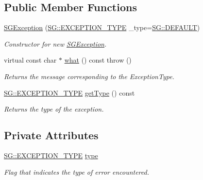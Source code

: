 \subsection*{Public Member Functions}
\begin{DoxyCompactItemize}
\item 
\mbox{\label{classSGException_a45a1ee37ef4e6d20c9711ee417009889}} 
\hyperlink{classSGException_a45a1ee37ef4e6d20c9711ee417009889}{S\+G\+Exception} (\hyperlink{namespaceSG_a671df7c720746d1e853deee02bad6411}{S\+G\+::\+E\+X\+C\+E\+P\+T\+I\+O\+N\+\_\+\+T\+Y\+PE} \+\_\+type=\hyperlink{namespaceSG_a671df7c720746d1e853deee02bad6411a0c0f6f82ce3e38637b36fdf4fe34d79f}{S\+G\+::\+D\+E\+F\+A\+U\+LT})
\begin{DoxyCompactList}\small\item\em Constructor for new \hyperlink{classSGException}{S\+G\+Exception}. \end{DoxyCompactList}\item 
\mbox{\label{classSGException_a5a43e290f591ee26d0674d3455f6c144}} 
virtual const char $\ast$ \hyperlink{classSGException_a5a43e290f591ee26d0674d3455f6c144}{what} () const  throw ()
\begin{DoxyCompactList}\small\item\em Returns the message corresponding to the Exception\+Type. \end{DoxyCompactList}\item 
\mbox{\label{classSGException_afd64ecf52ffdf1b2f8c20103a73cbc60}} 
\hyperlink{namespaceSG_a671df7c720746d1e853deee02bad6411}{S\+G\+::\+E\+X\+C\+E\+P\+T\+I\+O\+N\+\_\+\+T\+Y\+PE} \hyperlink{classSGException_afd64ecf52ffdf1b2f8c20103a73cbc60}{get\+Type} () const
\begin{DoxyCompactList}\small\item\em Returns the type of the exception. \end{DoxyCompactList}\end{DoxyCompactItemize}
\subsection*{Private Attributes}
\begin{DoxyCompactItemize}
\item 
\mbox{\label{classSGException_aa010288cdfd8ff0ef068b23c614601b6}} 
\hyperlink{namespaceSG_a671df7c720746d1e853deee02bad6411}{S\+G\+::\+E\+X\+C\+E\+P\+T\+I\+O\+N\+\_\+\+T\+Y\+PE} \hyperlink{classSGException_aa010288cdfd8ff0ef068b23c614601b6}{type}
\begin{DoxyCompactList}\small\item\em Flag that indicates the type of error encountered. \end{DoxyCompactList}\end{DoxyCompactItemize}


